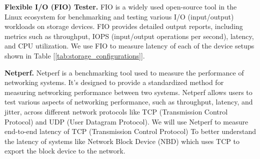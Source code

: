 \par\textbf{Flexible I/O (FIO) Tester.}
FIO is a widely used open-source tool in the Linux ecosystem for benchmarking
and testing various I/O (input/output) workloads on storage devices. FIO
provides detailed output reports, including metrics such as throughput, IOPS
(input/output operations per second), latency, and CPU utilization. We use FIO to measure latency of each of the device setups shown in Table [\ref{tab:storage_configurations}]. 

\begin{table}[h!]
\centering
{}
\caption{Storage device setups.}
\label{tab:storage_configurations}
\end{table}

\par\textbf{Netperf.} 
Netperf is a benchmarking tool used to measure the performance of networking
systems. It's designed to provide a standardized method for measuring networking
performance between two systems. Netperf allows users to test various aspects of
networking performance, such as throughput, latency, and jitter, across
different network protocols like TCP (Transmission Control Protocol) and UDP
(User Datagram Protocol). We will use Netperf to measure end-to-end latency of
TCP (Transmission Control Protocol) To better understand the latency of systems
like Network Block Device (NBD) which uses TCP to export the block device to the
network.

